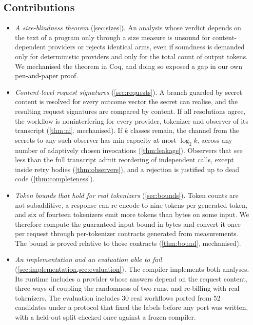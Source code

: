 \subsection{Contributions}\label{sec:contributions}

\begin{itemize}[leftmargin=*]
\item \emph{A size-blindness theorem} (\cref{sec:sizes}). An analysis whose verdict
  depends on the text of a program only through a size measure is unsound for
  content-dependent providers or rejects identical arms, even if soundness is
  demanded only for deterministic providers and only for the total count of output
  tokens. We mechanised the theorem in Coq, and doing so exposed a gap in our own
  pen-and-paper proof.
\item \emph{Content-level request signatures} (\cref{sec:requests}). A branch
  guarded by secret content is resolved for every outcome vector the secret can
  realise, and the resulting request signatures are compared by content. If all
  resolutions agree, the workflow is noninterfering for every provider, tokenizer
  and observer of its transcript (\cref{thm:ni}, mechanised). If $k$ classes remain,
  the channel from the secrets to any such observer has min-capacity at most
  $\log_2 k$, across any number of adaptively chosen invocations
  (\cref{thm:leakage}). Observers that see less than the full transcript admit
  reordering of independent calls, except inside retry bodies (\cref{thm:observers}),
  and a rejection is justified up to dead code (\cref{thm:completeness}).
\item \emph{Token bounds that hold for real tokenizers} (\cref{sec:bounds}). Token
  counts are not subadditive, a response can re-encode to nine tokens per generated
  token, and six of fourteen tokenizers emit more tokens than bytes on some input.
  We therefore compute the guaranteed input bound in bytes and convert it once per
  request through per-tokenizer contracts generated from measurements. The bound
  is proved relative to those contracts (\cref{thm:bound}, mechanised).
\item \emph{An implementation and an evaluation able to fail} (\cref{sec:implementation,sec:evaluation}).
  The compiler  implements both analyses. Its runtime includes a
  provider whose answers depend on the request content, three ways of coupling
  the randomness of two runs, and re-billing with real tokenizers. The evaluation
  includes 30 real workflows ported from 52 candidates under a protocol that fixed
  the labels before any port was written, with a held-out split checked once
  against a frozen compiler.
\end{itemize}

